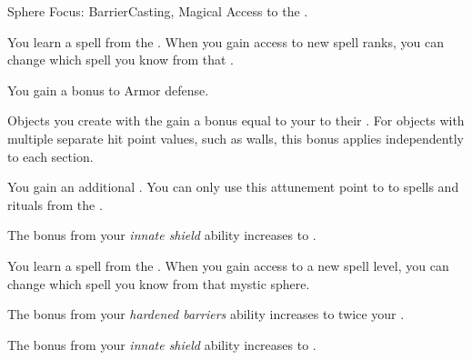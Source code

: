     \begin{feat}{Sphere Focus: Barrier}{Casting, Magical}
        \featpre Access to the  .

         You learn a spell from the  .
        When you gain access to new spell ranks, you can change which spell you know from that .

         You gain a  bonus to Armor defense.

         Objects you create with the   gain a bonus equal to your  to their .
        For objects with multiple separate hit point values, such as walls, this bonus applies independently to each section.

         You gain an additional .
        You can only use this attunement point to  to spells and rituals from the  .

         The bonus from your \textit{innate shield} ability increases to .

         You learn a spell from the  .
        When you gain access to a new spell level, you can change which spell you know from that mystic sphere.

         The bonus from your \textit{hardened barriers} ability increases to twice your .

         The bonus from your \textit{innate shield} ability increases to .
    \end{feat}


